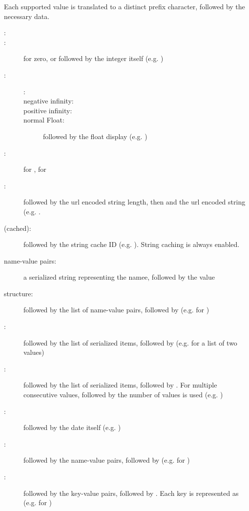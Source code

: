 Each supported value is translated to a distinct prefix character, followed by the necessary data.

\begin{description}
	\item[:] 
	\item[:]  for zero, or  followed by the integer itself (e.g. )
	\item[:]
		\begin{description}
			\item[:] 
			\item[negative infinity:] 
			\item[positive infinity:] 
			\item[normal Float:]  followed by the float display (e.g. )
		\end{description}
	\item[:]  for ,  for 
	\item[:]  followed by the url encoded string length, then \expr{:} and the url encoded string (e.g. .
	\item[ (cached):]  followed by the string cache ID (e.g. ). String caching is always enabled.
	\item[name-value pairs:] a serialized string representing the namee, followed by the value
	\item[structure:]  followed by the list of name-value pairs, followed by  (e.g.  for )
	\item[:]  followed by the list of serialized items, followed by  (e.g.  for a list of two  values)
	\item[:]  followed by the list of serialized items, followed by . For multiple consecutive  values,  followed by the number of  values is used (e.g. )
	\item[:]  followed by the date itself (e.g. )
	\item[:]  followed by the name-value pairs, followed by  (e.g.  for )
	\item[:]  followed by the key-value pairs, followed by . Each key is represented as  (e.g.  for )

\end{description}
